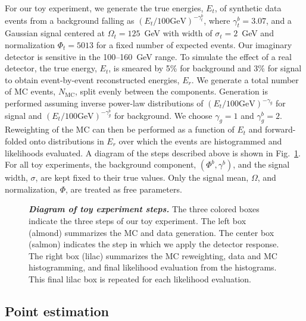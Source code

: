 \documentclass[a4paper, 11pt]{article}
\begin{document}
For our toy experiment, we generate the true energies, $E_t$, of synthetic data events from a background falling as $(E_t/100 \mathrm{GeV})^{-\gamma_t^b}$, where $\gamma_t^b=3.07$, and a Gaussian signal centered at $\Omega_t=125$~GeV with width of $\sigma_t=2$~GeV and normalization $\Phi_t=5013$ for a fixed number of expected events. Our imaginary detector is sensitive in the 100--160~GeV range. To simulate the effect of a real detector, the true energy, $E_t$, is smeared by 5\% for background and 3\% for signal to obtain event-by-event reconstructed energies, $E_r$. We generate a total number of MC events, $N_{\mathrm{MC}}$, split evenly between the components. Generation is performed assuming inverse power-law distributions of $(E_t/100 \mathrm{GeV})^{-\gamma_g}$ for signal and $(E_t/100 \mathrm{GeV})^{-\gamma_g^b}$ for background. We choose $\gamma_g=1$ and $\gamma_g^b=2$. Reweighting of the MC can then be performed as a function of $E_t$ and forward-folded onto distributions in $E_r$ over which the events are histogrammed and likelihoods evaluated. A diagram of the steps described above is shown in Fig.~\ref{fig:mc_diagram}. For all toy experiments, the background component, $(\Phi^b,\gamma^b)$, and the signal width, $\sigma$, are kept fixed to their true values. Only the signal mean, $\Omega$, and normalization, $\Phi$, are treated as free parameters.

\begin{figure}[htp]

\caption{\textbf{\textit{Diagram of toy experiment steps.}} The three colored boxes indicate the three steps of our toy experiment. The left box (almond) summarizes the MC and data generation. The center box (salmon) indicates the step in which we apply the detector response. The right box (lilac) summarizes the MC reweighting, data and MC histogramming, and final likelihood evaluation from the histograms. This final lilac box is repeated for each likelihood evaluation.}
\label{fig:mc_diagram}
\end{figure}

\subsection{Point estimation}
\label{sec:pointestimation}
\end{document}
